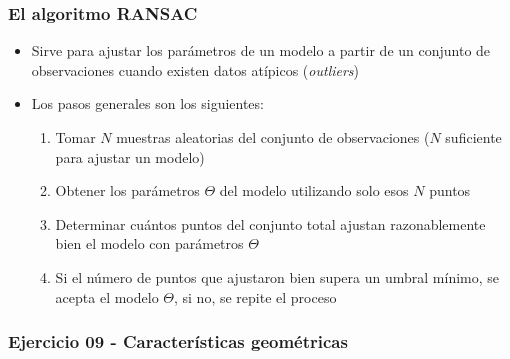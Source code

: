 \begin{frame}\frametitle{El algoritmo RANSAC}
  \begin{itemize}
  \item Sirve para ajustar los parámetros de un modelo a partir de un conjunto de observaciones cuando existen datos atípicos (\textit{outliers})
  \item Los pasos generales son los siguientes:
    \begin{enumerate}
    \item Tomar $N$ muestras aleatorias del conjunto de observaciones ($N$ suficiente para ajustar un modelo)
    \item Obtener los parámetros $\Theta$ del modelo utilizando solo esos $N$ puntos
    \item Determinar cuántos puntos del conjunto total ajustan razonablemente bien el modelo con parámetros $\Theta$
    \item Si el número de puntos que ajustaron bien supera un umbral mínimo, se acepta el modelo $\Theta$, si no, se repite el proceso 
    \end{enumerate}
  \end{itemize}
\end{frame}

\begin{frame}\frametitle{Ejercicio 09 - Características geométricas}
\end{frame}